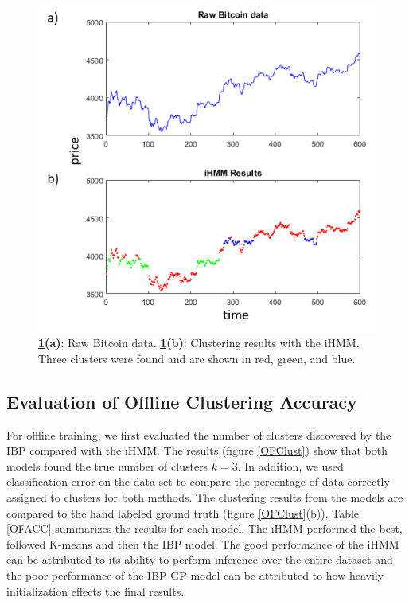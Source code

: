 \documentclass{article}
\begin{document}
\begin{figure}[ht]
\vskip 0.2in
\begin{center}
\centerline{\includegraphics[width=\columnwidth]{BTCClust}}
\caption{\textbf{\ref{BTCClust}(a)}: Raw Bitcoin data. \textbf{\ref{BTCClust}(b)}: Clustering results with the iHMM. Three clusters were found and are shown in red, green, and blue.}
\label{BTCClust}
\end{center}
\vskip -0.2in
\end{figure} 

\subsection{Evaluation of Offline Clustering Accuracy}

For offline training, we first evaluated the number of clusters discovered by the IBP compared with the iHMM. The results (figure \ref{OFClust}) show that both models found the true number of clusters $k=3$. In addition, we used classification error on the data set to compare the percentage of data correctly assigned to clusters for both methods. The clustering results from the models are compared to the hand labeled ground truth (figure \ref{OFClust}(b)). Table \ref{OFACC} summarizes the results for each model. The iHMM performed the best, followed K-means and then the IBP model. The good performance of the iHMM can be attributed to its ability to perform inference over the entire dataset and the poor performance of the IBP GP model can be attributed to how heavily initialization effects the final results.
\end{document}
